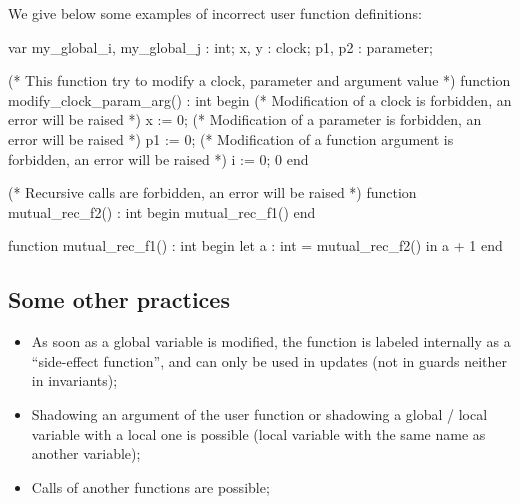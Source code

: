 \begin{example}
We give below some examples of incorrect user function definitions:

\begin{IMITATORmodel}
	var
	my_global_i, my_global_j : int;
	x, y : clock;
	p1, p2 : parameter;

	(* This function try to modify a clock, parameter and argument value *)
	function modify_clock_param_arg() : int
	begin
		(* Modification of a clock is forbidden, an error will be raised *)
		x := 0;
		(* Modification of a parameter is forbidden, an error will be raised *)
		p1 := 0;
		(* Modification of a function argument is forbidden, an error will be raised *)
		i := 0;
		0
	end

	(* Recursive calls are forbidden, an error will be raised *)
	function mutual_rec_f2() : int
	begin
		mutual_rec_f1()
	end

	function mutual_rec_f1() : int
	begin
		let a : int = mutual_rec_f2() in
		a + 1
	end

\end{IMITATORmodel}
\end{example}

\subsection{Some other practices}

\begin{itemize}
\item As soon as a global variable is modified, the function is labeled internally as a ``side-effect function'', and can only be used in updates (not in guards neither in invariants);
\item Shadowing an argument of the user function or shadowing a global / local variable with a local one is possible (local variable with the same name as another variable);
\item Calls of another functions are possible;
\end{itemize}

